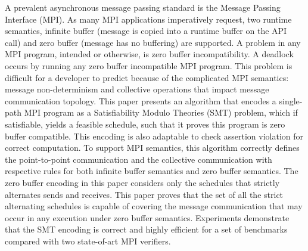 %
A prevalent asynchronous message passing standard is the Message Passing Interface (MPI). 
%
As many MPI applications imperatively request, two runtime semantics, infinite buffer (message is copied into a runtime buffer on the API call) and zero buffer (message has no buffering) are supported.
%
A problem in any MPI program, intended or otherwise, is zero buffer incompatibility. A deadlock occurs by running any zero buffer incompatible MPI program. 
%
This problem is difficult for a developer to predict because of the complicated MPI semantics: message non-determinism and collective operations that impact message communication topology. 
%
This paper presents an algorithm that encodes a single-path MPI program as a Satisfiability Modulo Theories (SMT) problem, which if satisfiable, yields a feasible schedule, such that it proves this program is zero buffer compatible. This encoding is also adaptable to check assertion violation for correct computation.
%
To support MPI semantics, this algorithm correctly defines the point-to-point communication and the collective communication with respective rules for both infinite buffer semantics and zero buffer semantics. 
%
The zero buffer encoding in this paper considers only the schedules that strictly alternates sends and receives. 
%
This paper proves that the set of all the strict alternating schedules is capable of covering the message communication that may occur in any execution under zero buffer semantics. 
%
%
%
%
%
%
%
%
Experiments demonstrate that the SMT encoding is correct and highly efficient for a set of benchmarks compared with two state-of-art MPI verifiers. 
%
